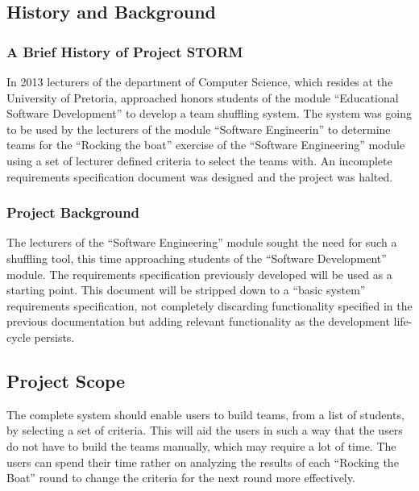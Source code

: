 \subsection{History and Background}
\subsubsection{A Brief History of Project STORM}
In 2013 lecturers of the department of Computer Science, which resides at the University of Pretoria,
approached honors students of the module ``Educational Software Development'' to develop a team
shuffling system. 
The system was going to be used by the lecturers of the module ``Software Engineerin'' to
determine teams for the ``Rocking the boat'' exercise of the ``Software Engineering'' module using a
set of lecturer defined criteria to select the teams with. An incomplete requirements specification document
was designed and the project was halted. 

\subsubsection{Project Background}
The lecturers of the ``Software Engineering'' module sought the need for such a shuffling tool, this
time approaching students of the ``Software Development'' module. The requirements specification previously 
developed will be used as a starting point. This document will be stripped down to a ``basic system'' requirements
specification, not completely discarding functionality specified in the previous documentation but adding relevant functionality
as the development life-cycle persists.

\subsection{Project Scope}
The complete system should enable users to build teams, from a list of students, by selecting a
set of criteria. This will aid the users in such a way that the users do not have to build the teams
manually, which may require a lot of time. The users can spend their time rather on analyzing
the results of each ``Rocking the Boat'' round to change the criteria for the next round more
effectively.
